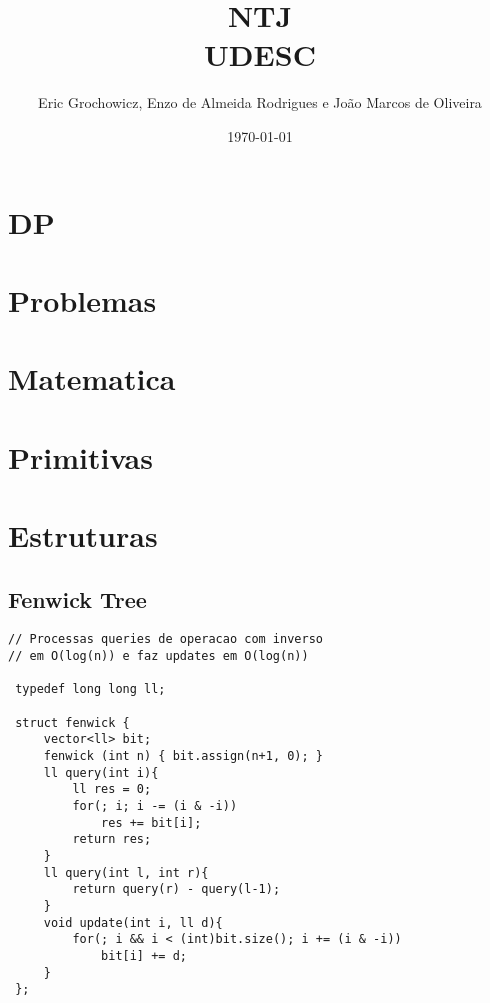 \documentclass[11pt, a4paper, twoside]{article}
\title{NTJ \\ UDESC}
\author{Eric Grochowicz, Enzo de Almeida Rodrigues e João Marcos de Oliveira}
\begin{document}
\twocolumn
\date{\today}
\maketitle


\renewcommand{\contentsname}{Índice} %
\tableofcontents


%
%

\section{DP}



%
%

\section{Problemas}



%
%

\section{Matematica}



%
%

\section{Primitivas}



%
%

\section{Estruturas}

\subsection{Fenwick Tree}
\begin{lstlisting}
// Processas queries de operacao com inverso
// em O(log(n)) e faz updates em O(log(n))

 typedef long long ll;
 
 struct fenwick {
     vector<ll> bit;
     fenwick (int n) { bit.assign(n+1, 0); }
     ll query(int i){
         ll res = 0;
         for(; i; i -= (i & -i))
             res += bit[i];
         return res;
     }
     ll query(int l, int r){
         return query(r) - query(l-1);
     }
     void update(int i, ll d){
         for(; i && i < (int)bit.size(); i += (i & -i))
             bit[i] += d;
     }
 };
\end{lstlisting}
\end{document}
